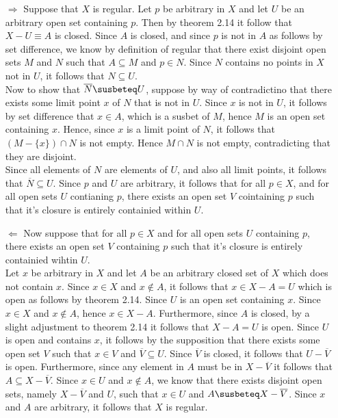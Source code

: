 \documentclass{article}
\begin{document}
\begin{itemize}
    \item[$\Rightarrow$] Suppose that $X$ is regular. Let $p$ be arbitrary in $X$ and let $U$ be an arbitrary open set containing $p$. Then by theorem 2.14 it follow that $X-U \equiv A$ is closed. Since $A$ is closed, and since $p$ is not in $A$ as follows by set difference, we know by definition of regular that there exist disjoint open sets $M$ and $N$ such that $A\subseteq M$ and $p\in N$. Since $N$ contains no points in $X$ not in $U$, it follows that $N\subseteq U$. \\
    
    Now to show that $\overline{N}\susbeteq U$, suppose by way of contradictino that there exists some limit point $x$ of $N$ that is not in $U$. Since $x$ is not in $U$, it follows by set difference that $x\in A$, which is a susbet of $M$, hence $M$ is an open set containing $x$. Hence, since $x$ is a limit point of $N$, it follows that $(M-\{x\})\cap N$ is not empty. Hence $M\cap N$ is not empty, contradicting that they are disjoint.\\
    
    Since all elements of $N$ are elements of $U$, and also all limit points, it follows that $\overline{N}\subseteq U$. Since $p$ and $U$ are arbitrary, it follows that for all $p\in X$, and for all open sets $U$ contianing $p$, there exists an open set $V$ cointaining $p$ such that it's closure is entirely containied within $U$.
    \item[$\Leftarrow$] Now suppose that for all $p\in X$ and for all open sets $U$ containing $p$, there exists an open set $V$ containing $p$ such that it's closure is entirely containied wihtin $U$.\\
    
    Let $x$ be arbitrary in $X$ and let $A$ be an arbitrary closed set of $X$ which does not contain $x$. Since $x\in X$ and $x\not\in A$, it follows that $x\in X- A = U$ which is open as follows by theorem 2.14. Since $U$ is an open set containing $x$. Since $x\in X$ and $x\not\in A$, hence $x\in X-A$. Furthermore, since $A$ is closed, by a slight adjustment to theorem 2.14 it follows that $X-A = U$ is open. Since $U$ is open and contains $x$, it follows by the supposition that there exists some open set $V$ such that $x\in V$ and $\overline{V}\subseteq U$. Since $\overline{V}$ is closed, it follows that $U-\overline{V}$ is open. Furthermore, since any element in $A$ must be in $X-\overline{V}$ it follows that $A\subseteq X-\overline{V}$. Since $x\in U$ and $x\not\in A$, we know that there exists disjoint open sets, namely $X-\overline{V}$ and $U$, such that $x\in U$ and $A\susbeteq X-\overline{V}$. Since $x$ and $A$ are arbitrary, it follows that $X$ is regular.
    \end{itemize}
\end{document}
